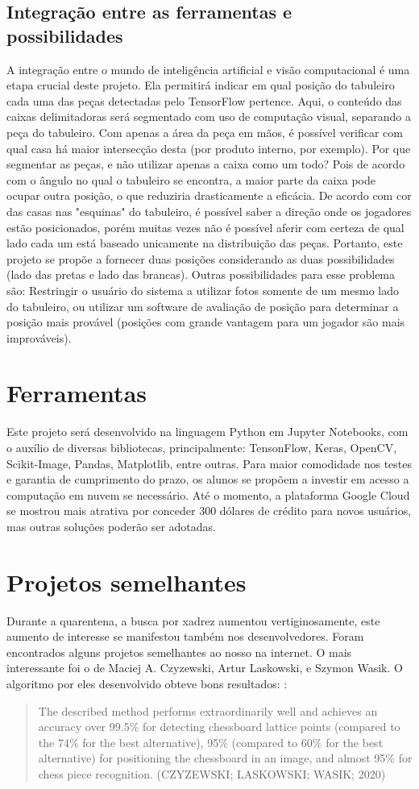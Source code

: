 \documentclass[a4paper,12pt,twoside]{article}
\begin{document}
\subsection{Integração entre as ferramentas e possibilidades}

A integração entre o mundo de inteligência artificial e visão computacional é uma etapa crucial deste projeto.
Ela permitirá indicar em qual posição do tabuleiro cada uma das peças detectadas pelo TensorFlow pertence.
Aqui, o conteúdo das caixas delimitadoras será segmentado com uso de computação visual, separando a peça do tabuleiro.
Com apenas a área da peça em mãos, é possível verificar com qual casa há maior intersecção desta (por produto interno, por exemplo).
Por que segmentar as peças, e não utilizar apenas a caixa como um todo? Pois de acordo com o ângulo no qual o tabuleiro se encontra, a maior parte da caixa pode ocupar outra posição, o que reduziria drasticamente a eficácia.
De acordo com cor das casas nas "esquinas" do tabuleiro, é possível saber a direção onde os jogadores estão posicionados, porém muitas vezes não é possível aferir com certeza de qual lado cada um está baseado unicamente na distribuição das peças.
Portanto, este projeto se propõe a fornecer duas posições considerando as duas possibilidades (lado das pretas e lado das brancas).
Outras possibilidades para esse problema são: Restringir o usuário do sistema a utilizar fotos somente de um mesmo lado do tabuleiro, ou utilizar um software de avaliação de posição para determinar a posição mais provável (posições com grande vantagem para um jogador são mais improváveis).

\section{Ferramentas}
Este projeto será desenvolvido na linguagem Python em Jupyter Notebooks, com o auxílio de diversas bibliotecas, principalmente: TensonFlow, Keras, OpenCV, Scikit-Image, Pandas, Matplotlib, entre outras.
Para maior comodidade nos testes e garantia de cumprimento do prazo, os alunos se propõem a investir em acesso a computação em nuvem se necessário.
Até o momento, a plataforma Google Cloud se mostrou mais atrativa por conceder 300 dólares de crédito para novos usuários, mas outras soluções poderão ser adotadas.

\section{Projetos semelhantes}
Durante a quarentena, a busca por xadrez aumentou vertiginosamente, este aumento de interesse se manifestou também nos desenvolvedores. Foram encontrados alguns projetos semelhantes ao nosso na internet. O mais interessante foi o de Maciej A. Czyzewski, Artur Laskowski, e Szymon Wasik. O algoritmo por eles desenvolvido obteve bons resultados:
\cite{czy20}:
\blockquote{The described method performs extraordinarily well and achieves an accuracy over 99.5\% for detecting chessboard lattice points (compared to the 74\% for the best alternative), 95\% (compared to 60\% for the best alternative) for positioning the chessboard in an image, and almost 95\% for chess piece recognition. (CZYZEWSKI; LASKOWSKI; WASIK; 2020)}
\end{document}
